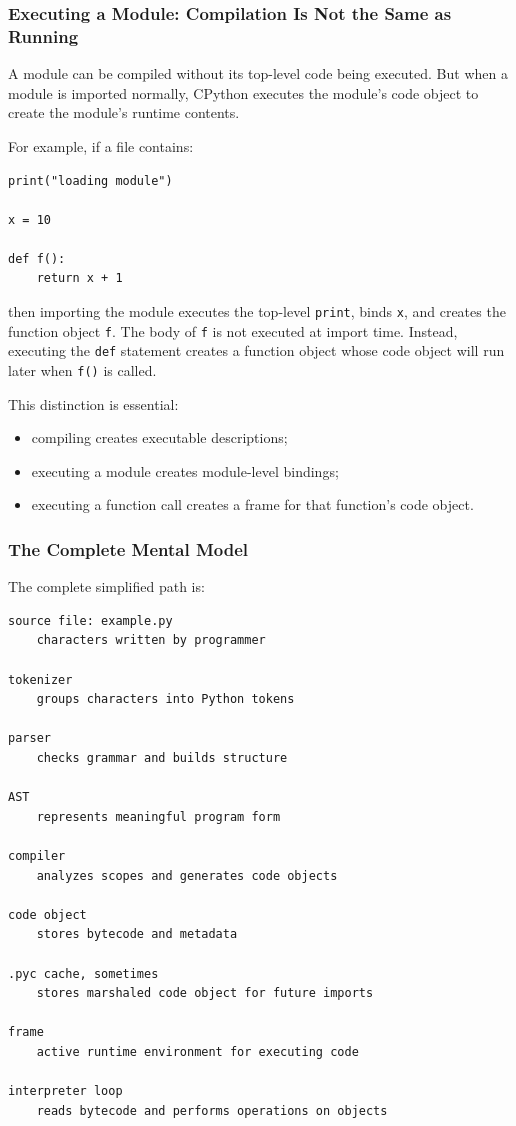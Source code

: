 \subsubsection{Executing a Module: Compilation Is Not the Same as Running}

A module can be compiled without its top-level code being executed. But when a module is imported normally, CPython executes the module's code object to create the module's runtime contents.

For example, if a file contains:

\begin{verbatim}
print("loading module")

x = 10

def f():
    return x + 1
\end{verbatim}

then importing the module executes the top-level \texttt{print}, binds \texttt{x}, and creates the function object \texttt{f}. The body of \texttt{f} is not executed at import time. Instead, executing the \texttt{def} statement creates a function object whose code object will run later when \texttt{f()} is called.

This distinction is essential:

\begin{itemize}
    \item compiling creates executable descriptions;
    \item executing a module creates module-level bindings;
    \item executing a function call creates a frame for that function's code object.
\end{itemize}

\subsubsection{The Complete Mental Model}

The complete simplified path is:

\begin{verbatim}
source file: example.py
    characters written by programmer

tokenizer
    groups characters into Python tokens

parser
    checks grammar and builds structure

AST
    represents meaningful program form

compiler
    analyzes scopes and generates code objects

code object
    stores bytecode and metadata

.pyc cache, sometimes
    stores marshaled code object for future imports

frame
    active runtime environment for executing code

interpreter loop
    reads bytecode and performs operations on objects
\end{verbatim}

